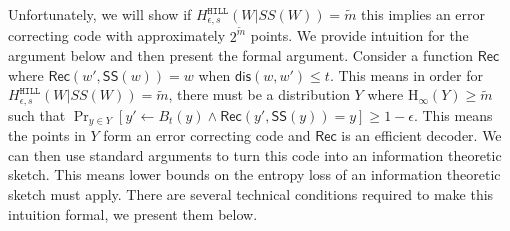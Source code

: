 \documentclass[11pt]{article}
\newcommand{\class}[1]{{\ensuremath{\mathsf{#1}}}}
\newcommand{\sketch}{\ensuremath{\class{SS}}\xspace}
\newcommand{\rec}{\ensuremath{\class{Rec}}\xspace}
\newcommand{\dis}{\ensuremath{\mathsf{dis}}}
\newcommand{\hill}{\ensuremath{\mathtt{HILL}}\xspace}
\newcommand{\Hoo}{\mathrm{H}_\infty}
\newtheorem{definition}[theorem]{Definition}
\begin{document}
Unfortunately, we will show if $H^{\hill}_{\epsilon, s}(W|SS(W))= \tilde{m}$ this implies an error correcting code with approximately $2^{\tilde{m}}$ points.  We provide intuition for the argument below and then present the formal argument.  Consider a function $\rec$ where $\rec (w', \sketch(w)) = w$ when $\dis(w, w')\leq t$.  This means in order for $H^{\hill}_{\epsilon, s}(W|SS(W))= \tilde{m}$, there must be a distribution $Y$ where $\Hoo(Y)\geq \tilde{m}$ such that $\Pr_{y\in Y} [y'\leftarrow B_t(y) \wedge \rec(y', \sketch(y)) = y ]\geq 1-\epsilon$.  This means the points in $Y$ form an error correcting code and $\rec$ is an efficient decoder.  We can then use standard arguments to turn this code into an information theoretic sketch.  This means lower bounds on the entropy loss of an information theoretic sketch must apply.  There are several technical conditions required to make this intuition formal, we present them below.
\end{document}
